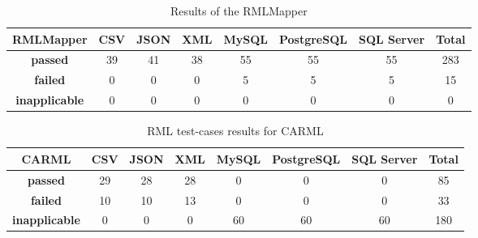 \begin{table}[]
\centering 
\caption[RML test-cases results for RMLMapper]{Results of the RMLMapper}
\label{tab:rmlmapper}
\begin{tabular}{c|c|c|c|c|c|c|c}

RMLMapper                 & \textbf{CSV} & \textbf{JSON} & \textbf{XML} & \textbf{MySQL} & \textbf{PostgreSQL} & \textbf{SQL Server} & \textbf{Total} \\ \hline
\textbf{passed}       & 39           & 41           & 38            & 55              & 55               & 55                   & 283             \\ \hline
\textbf{failed}       & 0           & 0           & 0            & 5              & 5                   & 5                   & 15             \\ \hline
\textbf{inapplicable} & 0            & 0             & 0             & 0             & 0                  & 0                  & 0            \\ 
\end{tabular}
\end{table}


\begin{table}[]
\centering
\caption{RML test-cases results for CARML}
\label{tab:carml}
\begin{tabular}{c|c|c|c|c|c|c|c}

CARML                 & \textbf{CSV} & \textbf{JSON} & \textbf{XML} & \textbf{MySQL} & \textbf{PostgreSQL} & \textbf{SQL Server} & \textbf{Total} \\ \hline
\textbf{passed}       & 29           & 28           & 28            & 0              & 0                   & 0                   & 85             \\ \hline
\textbf{failed}       & 10           & 10           & 13            & 0              & 0                   & 0                   & 33             \\ \hline
\textbf{inapplicable} & 0            & 0             & 0             & 60             & 60                  & 60                  & 180            \\ 
\end{tabular}
\end{table}


